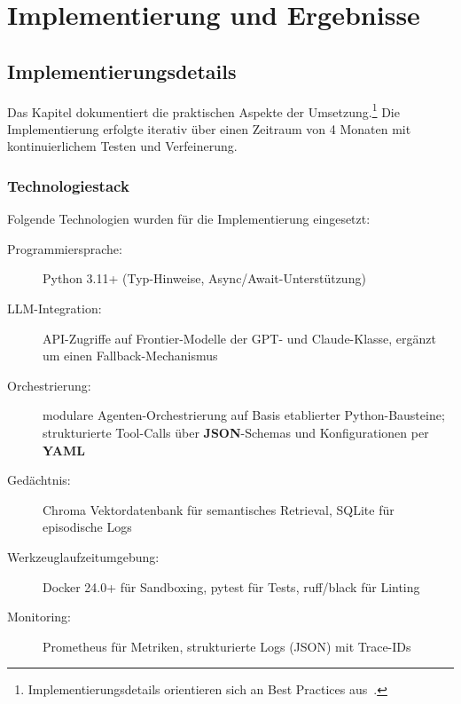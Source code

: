 
\chapter{Implementierung und Ergebnisse}
%
%
%
\label{ch:realisierung}

\section{Implementierungsdetails}

Das Kapitel dokumentiert die praktischen Aspekte der Umsetzung.\footnote{Implementierungsdetails orientieren sich an Best Practices aus~\cite{martin2008clean}.}
Die Implementierung erfolgte iterativ über einen Zeitraum von 4 Monaten mit kontinuierlichem Testen und Verfeinerung.

\subsection{Technologiestack}

Folgende Technologien wurden für die Implementierung eingesetzt:

\begin{sloppypar}
\begin{description}
  \item[Programmiersprache:] Python 3.11+ (Typ-Hinweise, Async/Await-Un\-ter\-stüt\-zung)
  \item[LLM-Integration:] API-Zugriffe auf Frontier-Modelle der GPT- und Claude-Klasse, ergänzt um einen Fallback-Mechanismus
  \item[Orchestrierung:] modulare Agenten-Orchestrierung auf Basis etablierter Python-Bausteine; strukturierte Tool-Calls über \textbf{JSON}-Schemas und Konfigurationen per \textbf{YAML}
  \item[Gedächtnis:] Chroma Vektordatenbank für semantisches Retrieval, SQLite für episodische Logs
  \item[Werkzeuglaufzeitumgebung:] Docker 24.0+ für Sandboxing, pytest für Tests, ruff/black für Linting
  \item[Monitoring:] Prometheus für Metriken, strukturierte Logs (JSON) mit Trace-IDs
\end{description}
\end{sloppypar}

